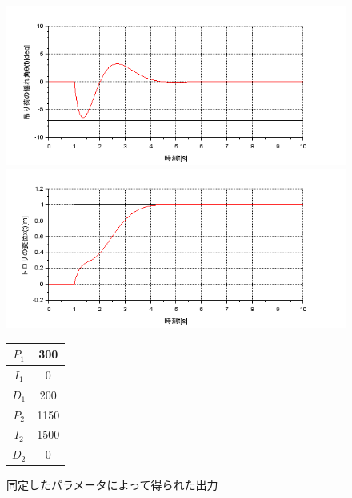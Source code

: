 \documentclass[dvipdfmx,titlepage,a4j]{jsarticle}  %
\begin{document}
\begin{figure}[H]
  \begin{minipage}{4.5cm}
    \centering
    \includegraphics[keepaspectratio, scale=0.35]{../graph/crane/ang-final.png}
  \end{minipage}
  \hfill
  \begin{minipage}{4.5cm}
    \centering
    \includegraphics[keepaspectratio, scale=0.35]{../graph/crane/po-final.png}
  \end{minipage}
  \hfill
  \begin{minipage}{3cm}
      \begin{center}
        \begin{tabular}{c|c}
          \hline
          $P_1$ & 300\\ \hline
          $I_1$ & 0\\ \hline
          $D_1$ & 200\\ \hline
          $P_2$ & 1150\\ \hline
          $I_2$ & 1500\\ \hline
          $D_2$ & 0\\
          \hline
        \end{tabular}
      \end{center}
  \end{minipage}
  \hfill
  \caption{同定したパラメータによって得られた出力}
  \label{fig:crane:final}
\end{figure}
\end{document}
